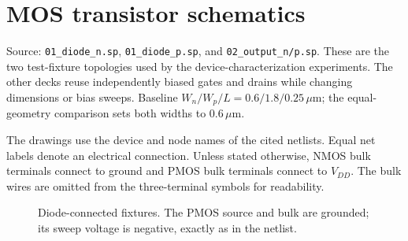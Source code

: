 \clearpage\section{MOS transistor schematics}
Source: \texttt{01\_diode\_n.sp}, \texttt{01\_diode\_p.sp}, and \texttt{02\_output\_n/p.sp}. These are the two test-fixture topologies used by the device-characterization experiments. The other decks reuse independently biased gates and drains while changing dimensions or bias sweeps. Baseline $W_n/W_p/L=0.6/1.8/0.25\,\mu$m; the equal-geometry comparison sets both widths to $0.6\,\mu$m.

The drawings use the device and node names of the cited netlists. Equal net labels denote an electrical connection. Unless stated otherwise, NMOS bulk terminals connect to ground and PMOS bulk terminals connect to $V_{DD}$. The bulk wires are omitted from the three-terminal symbols for readability.
\begin{figure}[!htbp]\centering
{}
\caption{Diode-connected fixtures. The PMOS source and bulk are grounded; its sweep voltage is negative, exactly as in the netlist.}
\end{figure}
